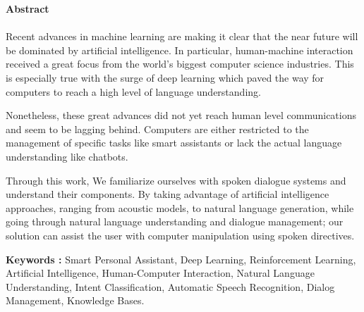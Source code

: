 \vspace*{0.8cm}

\newpage
\clearpage
\begin{center}
    \Large 
    \textbf{Abstract}
\end{center}

\paragraph{}
Recent advances in machine learning are making it clear that the near future will be dominated by artificial intelligence. In particular, human-machine interaction received a great focus from the world's biggest computer science industries. This is especially true with the surge of deep learning which paved the way for computers to reach a high level of language understanding.

Nonetheless, these great advances did not yet reach human level communications and seem to be lagging behind. Computers are either restricted to the management of specific tasks like smart assistants or lack the actual language understanding like chatbots.

Through this work, We familiarize ourselves with spoken dialogue systems and understand their components. By taking advantage of artificial intelligence approaches, ranging from acoustic models, to natural language generation, while going through natural language understanding and dialogue management; our solution can assist the user with computer manipulation using spoken directives.

\noindent
\textbf{Keywords :} Smart Personal Assistant, Deep Learning, Reinforcement Learning, Artificial Intelligence, Human-Computer Interaction, Natural Language Understanding, Intent Classification, Automatic Speech Recognition, Dialog Management, Knowledge Bases.